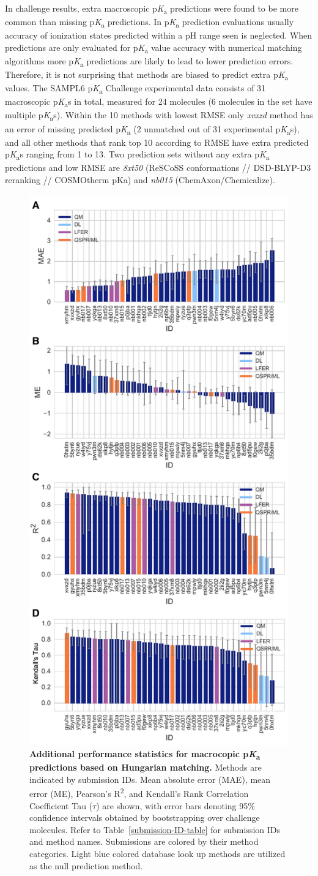 \documentclass[9pt,lineno,final]{elife}
\newcommand{\pKa}{p\textit{K}\textsubscript{a}}
\begin{document}
In challenge results, extra macroscopic \pKa{} predictions were found to be more common than missing \pKa{} predictions. 
In \pKa{} prediction evaluations usually accuracy of ionization states predicted within a pH range seen is neglected. 
When predictions are only evaluated for \pKa{} value accuracy with numerical matching algorithms more \pKa{} predictions are likely to lead to lower prediction errors. 
Therefore, it is not surprising that methods are biased to predict extra \pKa{} values. 
The SAMPL6 \pKa{} Challenge experimental data consists of 31 macroscopic \pKa{}s in total, measured for 24 molecules (6 molecules in the set have multiple \pKa{}s).
Within the 10 methods with lowest RMSE only \textit{xvxzd} method has an error of missing predicted \pKa{} (2 unmatched out of 31 experimental \pKa{}s), and all other methods that rank top 10 according to RMSE have extra predicted \pKa{}s ranging from 1 to 13. Two prediction sets without any extra \pKa{} predictions and low RMSE are \textit{8xt50} (ReSCoSS conformations // DSD-BLYP-D3 reranking // COSMOtherm pKa) and \textit{nb015} (ChemAxon/Chemicalize).



\begin{figure}[ht!]
\centering
\includegraphics[width=0.5\linewidth]{figures/typeIII_statistics.pdf}
\caption{{\bf Additional performance statistics for macrocopic \pKa{} predictions based on Hungarian matching.} 
Methods are indicated by submission IDs. 
Mean absolute error (MAE), mean error (ME), Pearson’s R\textsuperscript{2}, and Kendall’s Rank Correlation Coefficient Tau ($\tau$) are shown, with error bars denoting 95\% confidence intervals obtained by bootstrapping over challenge molecules. Refer to Table~\ref{submission-ID-table} for submission IDs and method names. Submissions are colored by their method categories. Light blue colored database look up methods are utilized as the null prediction method.
}
\label{fig:typeIII-statistics}
\end{figure}
\end{document}
